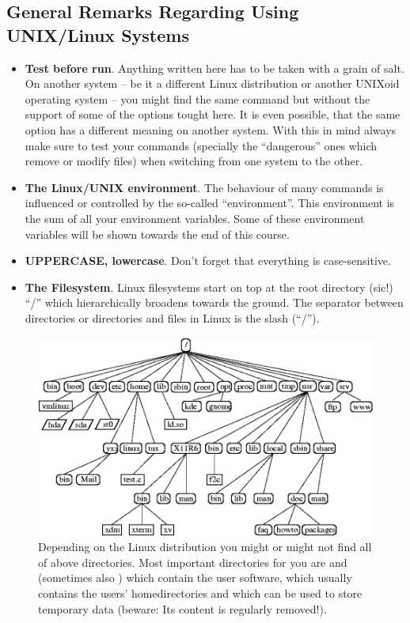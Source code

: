 \documentclass[letterpaper,10pt,english]{sphinxmanual}
\begin{document}
\subsection{General Remarks Regarding Using UNIX/Linux Systems}
\label{IntroToCommandLine:general-remarks-regarding-using-unix-linux-systems}\begin{itemize}
\item {} 
\textbf{Test before run}. Anything written here has to be taken with a grain of salt. On another system – be it a different Linux distribution or another UNIXoid operating system – you might find the same command but without the support of some of the options tought here. It is even possible, that the same option has a different meaning on another system. With this in mind always make sure to test your commands (specially the “dangerous” ones which remove or modify files) when switching from one system to the other.

\item {} 
\textbf{The Linux/UNIX environment}. The behaviour of many commands is influenced or controlled by the so-called “environment”. This environment is the sum of all your environment variables. Some of these environment variables will be shown towards the end of this course.

\item {} 
\textbf{UPPERCASE, lowercase}. Don’t forget that everything is case-sensitive.

\item {} 
\textbf{The Filesystem}. Linux filesystems start on top at the root directory (sic!) “/” which hierarchically broadens towards the ground.  The separator between directories or directories and files in Linux is the slash (“/”).

\end{itemize}
\begin{figure}[htbp]
\centering
\capstart

\includegraphics{_static/filesystem.png}
\caption{Depending on the Linux distribution you might or might not find all of above
directories. Most important directories for you are  and 
(sometimes also ) which contain the user software,  which
usually contains the users’ homedirectories and  which can be used to store
temporary data (beware: Its content is regularly removed!).}\end{figure}
\end{document}
